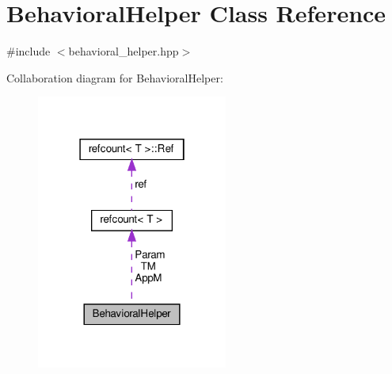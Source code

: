 \hypertarget{classBehavioralHelper}{}\section{Behavioral\+Helper Class Reference}
\label{classBehavioralHelper}


{\ttfamily \#include $<$behavioral\+\_\+helper.\+hpp$>$}



Collaboration diagram for Behavioral\+Helper\+:
\nopagebreak
\begin{figure}[H]
\begin{center}
\leavevmode
\includegraphics[width=178pt]{d3/d74/classBehavioralHelper__coll__graph}
\end{center}
\end{figure}
